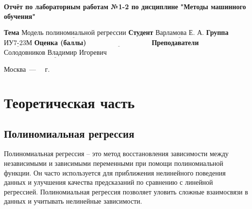 \documentclass[12pt]{report}
\begin{document}
\begin{titlepage}
	
	\begin{center}
		\noindent\begin{minipage}{1.3\textwidth}\centering
			\Large\textbf{  Отчёт по лабораторным работам №1-2 по дисциплине}\newline
			\textbf{ "Методы машинного обучения"}\newline\newline
		\end{minipage}
	\end{center}
	
	\noindent\textbf{Тема} $\underline{\text{Модель полиномиальной регрессии}}$\newline\newline
	\noindent\textbf{Студент} $\underline{\text{Варламова Е. А.}}$\newline\newline
	\noindent\textbf{Группа} $\underline{\text{ИУ7-23М}}$\newline\newline
	\noindent\textbf{Оценка (баллы)} $\underline{\text{~~~~~~~~~~~~~~~~~~~~~~~~~~~}}$\newline\newline
	\noindent\textbf{Преподаватели} $\underline{\text{Солодовников Владимир Игоревич}}$\newline\newline\newline
	
	\begin{center}
		\vfill
		Москва~---~\the\year
		~г.
	\end{center}
\end{titlepage}
\large
\setcounter{page}{2}
\def\contentsname{СОДЕРЖАНИЕ}
\renewcommand{\contentsname}{СОДЕРЖАНИЕ}
\tableofcontents
\renewcommand\labelitemi{---}
\newpage
\chapter{Теоретическая часть}
\section{Полиномиальная регрессия}

Полиномиальная регрессия -- это метод восстановления зависимости между независимыми и зависимыми переменными при помощи полиномиальной функции. Он часто используется для приближения нелинейного поведения данных и улучшения качества предсказаний по сравнению с линейной регрессией. Полиномиальная регрессия позволяет уловить сложные взаимосвязи в данных и учитывать нелинейные зависимости.
\end{document}
